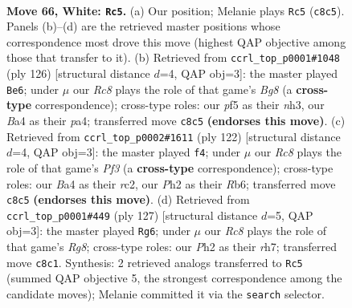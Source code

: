 \documentclass[11pt]{article}
\begin{document}
\clearpage

\begin{figure}[p]\centering
\begin{subfigure}{0.46\textwidth}\centering
\resizebox{\linewidth}{!}{%
\newchessgame
\chessboard[
  setfen={2R5/k7/8/5p2/B4P2/4K3/7P/8 w - - 3 66},
  showmover=false,
  pgfstyle=straightmove, color=movearrow, markmove={c8-c5}
]}
\caption{}
\end{subfigure}\hfill
\begin{subfigure}{0.46\textwidth}\centering
\resizebox{\linewidth}{!}{%
\newchessgame
\chessboard[
  setfen={6B1/8/8/2k5/p7/4KP1n/1P6/8 w - - 0 64},
  showmover=false,
  pgfstyle=straightmove, color=movearrow, markmove={g8-e6}
]}
\caption{}
\end{subfigure}
\\[4pt]
\begin{subfigure}{0.46\textwidth}\centering
\resizebox{\linewidth}{!}{%
\newchessgame
\chessboard[
  setfen={8/5k2/1R6/5p2/8/5PPK/2r5/8 w - - 2 62},
  showmover=false,
  pgfstyle=straightmove, color=movearrow, markmove={f3-f4}
]}
\caption{}
\end{subfigure}\hfill
\begin{subfigure}{0.46\textwidth}\centering
\resizebox{\linewidth}{!}{%
\newchessgame
\chessboard[
  setfen={8/7R/1k6/2p5/2P5/8/2K5/6r1 b - - 9 64},
  showmover=false,
  pgfstyle=straightmove, color=movearrow, markmove={g1-g6}
]}
\caption{}
\end{subfigure}
\caption{\textbf{Move 66, White: \texttt{Rc5}.} (a) Our position; Melanie plays \texttt{Rc5} (\texttt{c8c5}). Panels (b)--(d) are the retrieved master positions whose correspondence most drove this move (highest QAP objective among those that transfer to it). (b) Retrieved from \texttt{ccrl\_top\_p0001\#1048} (ply 126) [structural distance $d$=4, QAP obj=3]: the master played \texttt{Be6}; under $\mu$ our \emph{Rc8} plays the role of that game's \emph{Bg8} (a \textbf{cross-type} correspondence); cross-type roles: our \emph{p}f5 as their \emph{n}h3, our \emph{B}a4 as their \emph{p}a4; transferred move \texttt{c8c5} \textbf{(endorses this move)}. (c) Retrieved from \texttt{ccrl\_top\_p0002\#1611} (ply 122) [structural distance $d$=4, QAP obj=3]: the master played \texttt{f4}; under $\mu$ our \emph{Rc8} plays the role of that game's \emph{Pf3} (a \textbf{cross-type} correspondence); cross-type roles: our \emph{B}a4 as their \emph{r}c2, our \emph{P}h2 as their \emph{R}b6; transferred move \texttt{c8c5} \textbf{(endorses this move)}. (d) Retrieved from \texttt{ccrl\_top\_p0001\#449} (ply 127) [structural distance $d$=5, QAP obj=3]: the master played \texttt{Rg6}; under $\mu$ our \emph{Rc8} plays the role of that game's \emph{Rg8}; cross-type roles: our \emph{P}h2 as their \emph{r}h7; transferred move \texttt{c8c1}. Synthesis: 2 retrieved analogs transferred to \texttt{Rc5} (summed QAP objective 5, the strongest correspondence among the candidate moves); Melanie committed it via the \texttt{search} selector.}
\label{fig:thought-m130}
\end{figure}
\end{document}
